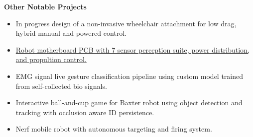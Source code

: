 \documentclass[letterpaper,10pt]{article}
\newcommand{\experience}[5]{%
    \noindent\textbf{#1}%
    \ifx&#2&
    \else
        , \textit{#2}%
    \fi
    \ifx&#3&
    \else
        , #3%
    \fi
    \hfill \textit{#4} \\
    \vspace{-6.8mm}%
    \begin{itemize}[itemsep=-5pt]
        \setlength{\itemindent}{0em}
        #5
    \end{itemize}
    \vspace{1mm}
}
\begin{document}

\vspace{1em}
{\Large \noindent\textbf{Other Notable Projects}} \\
\vspace{-1em}
\begin{itemize}
    \item In progress design of a non-invasive wheelchair attachment for low drag, hybrid manual and powered control.
    \item \href{https://ryanbarry.me/projects/electrical-engineering/underwater-robot/}{Robot motherboard PCB with 7 sensor perception suite, power distribution, and propultion control.}
    \item EMG signal live gesture classification pipeline using custom model trained from self-collected bio signals.
    \item Interactive ball-and-cup game for Baxter robot using object detection and tracking with occlusion aware ID persistence.
    \item Nerf mobile robot with autonomous targeting and firing system.
\end{itemize}
        


\end{document}
